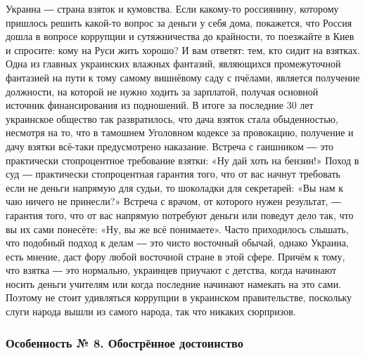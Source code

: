 Украина ― страна взяток и кумовства. Если какому-то россиянину, которому
пришлось решить какой-то вопрос за деньги у себя дома, покажется, что Россия
дошла в вопросе коррупции и сутяжничества до крайности, то поезжайте в Киев и
спросите: кому на Руси жить хорошо? И вам ответят: тем, кто сидит на взятках.
Одна из главных украинских влажных фантазий, являющихся промежуточной фантазией
на пути к тому самому вишнёвому саду с пчёлами, является получение должности,
на которой не нужно ходить за зарплатой, получая основной источник
финансирования из подношений. В итоге за последние 30 лет украинское общество
так развратилось, что дача взяток стала обыденностью, несмотря на то, что в
тамошнем Уголовном кодексе за провокацию, получение и дачу взятки всё-таки
предусмотрено наказание. Встреча с гаишником ― это практически стопроцентное
требование взятки: «Ну дай хоть на бензин!» Поход в суд ― практически
стопроцентная гарантия того, что от вас начнут требовать если не деньги
напрямую для судьи, то шоколадки для секретарей: «Вы нам к чаю ничего не
принесли?» Встреча с врачом, от которого нужен результат, ― гарантия того, что
от вас напрямую потребуют деньги или поведут дело так, что вы их сами понесёте:
«Ну, вы же всё понимаете». Часто приходилось слышать, что подобный подход к
делам ― это чисто восточный обычай, однако Украина, есть мнение, даст фору
любой восточной стране в этой сфере. Причём к тому, что взятка ― это нормально,
украинцев приучают с детства, когда начинают носить деньги учителям или когда
последние начинают намекать на это сами. Поэтому не стоит удивляться коррупции
в украинском правительстве, поскольку слуги народа вышли из самого народа, так
что никаких сюрпризов.

\subsubsection{Особенность № 8. Обострённое достоинство}

